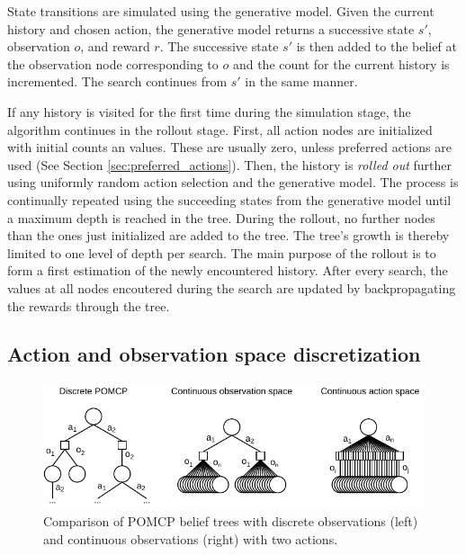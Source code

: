 
State transitions are simulated using the generative model. Given the current history and chosen action, the generative model returns a successive state $s'$, observation $o$, and reward $r$. The successive state $s'$ is then added to the belief at the observation node corresponding to $o$ and the count for the current history is incremented. The search continues from $s'$ in the same manner. 

If any history is visited for the first time during the simulation stage, the algorithm continues in the rollout stage. First, all action nodes are initialized with initial counts an values. These are usually zero, unless preferred actions are used (See Section \ref{sec:preferred_actions}). Then, the history is \textit{rolled out} further using uniformly random action selection and the generative model. The process is continually repeated using the succeeding states from the generative model until a maximum depth is reached in the tree. During the rollout, no further nodes than the ones just initialized are added to the tree. The tree's growth is thereby limited to one level of depth per search. The main purpose of the rollout is to form a first estimation of the newly encountered history. After every search, the values at all nodes encoutered during the search are updated by backpropagating the rewards through the tree.

\subsection{Action and observation space discretization}
\label{sec:discretization}

\begin{figure}[htbp]
    \centering
    \includegraphics[width=1.0\textwidth]{figures/pomcp_continuous.pdf}
    \caption[Comparison of POMCP belief trees with discrete observations and continuous observations]{Comparison of POMCP belief trees with discrete observations (left) and continuous observations (right) with two actions.}
    \label{fig:pomcp_cont}
\end{figure}

